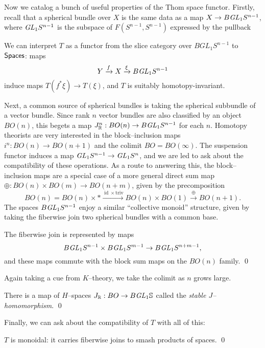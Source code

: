 Now we catalog a bunch of useful properties of the Thom space functor. Firstly, recall that a spherical bundle over $X$ is the same data as a map $X \to B \mathit{GL}_1 S^{n-1}$, where $\mathit{GL}_1 S^{n-1}$ is the subspace of $F(S^{n-1}, S^{n-1})$ expressed by the pullback
\begin{center}
\end{center}
We can interpret $T$ as a functor from the slice category over $BGL_1 S^{n-1}$ to $\mathsf{Spaces}$: maps \[Y \xrightarrow{f} X \xrightarrow{\xi} B \mathit{GL}_1 S^{n-1}\] induce maps $T(f^* \xi) \to T(\xi)$, and $T$ is suitably homotopy-invariant.

Next, a common source of spherical bundles is taking the spherical subbundle of a vector bundle.  Since rank $n$ vector bundles are also classified by an object $BO(n)$, this begets a map $J_{\mathbb R}^n: BO(n) \to B \mathit{GL}_1 S^{n-1}$ for each $n$.  Homotopy theorists are very interested in the block--inclusion maps $i^n: BO(n) \to BO(n+1)$ and the colimit $BO = BO(\infty)$.  The suspension functor induces a map $\mathit{GL}_1 S^{n-1} \to \mathit{GL}_1 S^n$, and we are led to ask about the compatibility of these operations.  As a route to answering this, the block--inclusion maps are a special case of a more general direct sum map $\oplus: BO(n) \times BO(m) \to BO(n+m)$, given by the precomposition \[BO(n) = BO(n) \times * \xrightarrow{\operatorname{id} \times \text{triv}} BO(n) \times BO(1) \xrightarrow\oplus BO(n+1).\] The spaces $B \mathit{GL}_1 S^{n-1}$ enjoy a similar ``collective monoid'' structure, given by taking the fiberwise join two spherical bundles with a common base.
\begin{lemma}
The fiberwise join is represented by maps \[B\mathit{GL}_1 S^{n-1} \times B\mathit{GL}_1 S^{m-1} \to B\mathit{GL}_1 S^{n+m-1},\] and these maps commute with the block sum maps on the $BO(n)$ family. \qed
\end{lemma}
\noindent Again taking a cue from $K$--theory, we take the colimit as $n$ grows large.
\begin{corollary}
There is a map of $H$--spaces $J_{\mathbb R}: BO \to B\mathit{GL}_1 \mathbb S$ called the \textit{stable $J$--homomorphism}. \qed
\end{corollary}
\noindent Finally, we can ask about the compatibility of $T$ with all of this:
\begin{lemma}
$T$ is monoidal: it carries fiberwise joins to smash products of spaces. \qed
\end{lemma}

